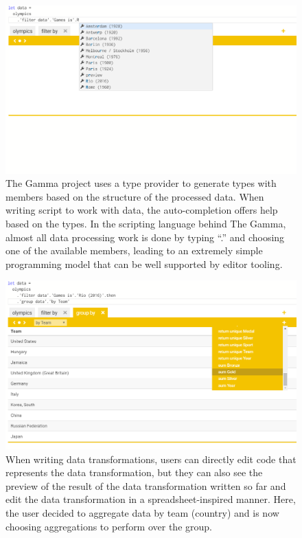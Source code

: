 \documentclass[sigconf,english]{acmart}
\begin{document}
\begin{figure}
\begin{center}
\includegraphics[scale=0.50,trim=0mm 60mm 0mm 0mm,clip]{fig1.png}
\end{center}
\vspace{-2em}
\caption{\textnormal{\small The Gamma project uses a type provider to generate types with members based on the structure 
of the processed data. When writing script to work with data, the auto-completion offers help based 
on the types. In the scripting language behind The Gamma, almost all data processing work is done by 
typing ``.'' and choosing one of the available members, leading to an extremely simple programming model 
that can be well supported by editor tooling.}}
\label{fig1}
\end{figure}


\begin{figure}
\begin{center}
\includegraphics[scale=0.2,trim=0mm 0mm 0mm 0mm,clip]{fig2.png}
\end{center}
\caption{\textnormal{\small When writing data transformations, users can directly edit code that represents the data 
  transformation, but they can also see the preview of the result of the data transformation written
  so far and edit the data transformation in a spreadsheet-inspired manner. Here, the user decided to 
  aggregate data by team (country) and is now choosing aggregations to perform over the group.}}
\label{fig2}
\end{figure}
\end{document}
